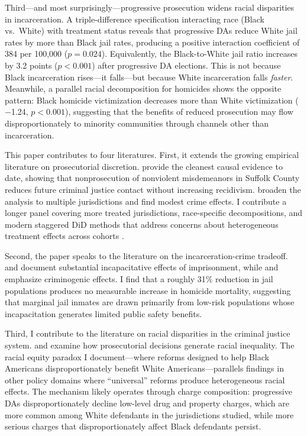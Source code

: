 \documentclass[12pt]{article}
\begin{document}
Third---and most surprisingly---progressive prosecution widens racial disparities in incarceration. A triple-difference specification interacting race (Black vs.\ White) with treatment status reveals that progressive DAs reduce White jail rates by more than Black jail rates, producing a positive interaction coefficient of 384 per 100,000 ($p = 0.024$). Equivalently, the Black-to-White jail ratio increases by 3.2 points ($p < 0.001$) after progressive DA elections. This is not because Black incarceration rises---it falls---but because White incarceration falls \textit{faster}. Meanwhile, a parallel racial decomposition for homicides shows the opposite pattern: Black homicide victimization decreases more than White victimization ($-$1.24, $p < 0.001$), suggesting that the benefits of reduced prosecution may flow disproportionately to minority communities through channels other than incarceration.

This paper contributes to four literatures. First, it extends the growing empirical literature on prosecutorial discretion. \citet{agan2023misdemeanor} provide the cleanest causal evidence to date, showing that nonprosecution of nonviolent misdemeanors in Suffolk County reduces future criminal justice contact without increasing recidivism. \citet{agan2025progressive} broaden the analysis to multiple jurisdictions and find modest crime effects. I contribute a longer panel covering more treated jurisdictions, race-specific decompositions, and modern staggered DiD methods that address concerns about heterogeneous treatment effects across cohorts \citep{goodmanbacon2021did, dechaisemartin2020two}.

Second, the paper speaks to the literature on the incarceration-crime tradeoff. \citet{levitt1996effect} and \citet{lofstrom2022incapacitation} document substantial incapacitative effects of imprisonment, while \citet{owens2009more} and \citet{harding2018imprisonment} emphasize criminogenic effects. I find that a roughly 31\% reduction in jail populations produces no measurable increase in homicide mortality, suggesting that marginal jail inmates are drawn primarily from low-risk populations whose incapacitation generates limited public safety benefits.

Third, I contribute to the literature on racial disparities in the criminal justice system. \citet{ouss2022prosecutor} and \citet{sloan2023progressive} examine how prosecutorial decisions generate racial inequality. The racial equity paradox I document---where reforms designed to help Black Americans disproportionately benefit White Americans---parallels findings in other policy domains where ``universal'' reforms produce heterogeneous racial effects. The mechanism likely operates through charge composition: progressive DAs disproportionately decline low-level drug and property charges, which are more common among White defendants in the jurisdictions studied, while more serious charges that disproportionately affect Black defendants persist.
\end{document}
